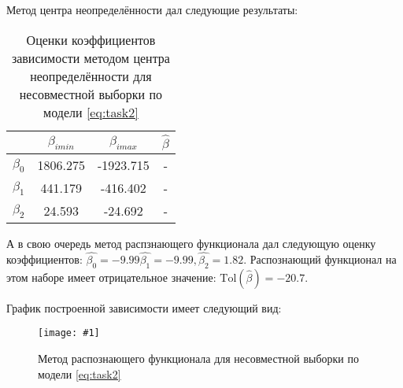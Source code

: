 \documentclass[a4paper,12pt]{article}
\newcommand{\plot}[3]{
    \begin{figure}[H]
        \texttt{[image: \#1]}
        \caption{#2}
        \label{#3}
    \end{figure}
}
\begin{document}
    \noindent Метод центра неопределённости дал следующие результаты:
    \begin{table}[H]
        \begin{center}
            \begin{tabular}{| c | c | c | c |}
                \hline
                & $ \beta_{imin} $ & $ \beta_{imax} $ & $ \hat{\beta} $ \\
                \hline
                $ \beta_{0} $ & 1806.275 & -1923.715 & - \\
                \hline
                $ \beta_{1} $ & 441.179 & -416.402 & - \\
                \hline
                $ \beta_{2} $ & 24.593 & -24.692 & - \\
                \hline
            \end{tabular}
        \end{center}
        \caption{Оценки коэффициентов зависимости методом центра неопределённости для несовместной выборки по модели \ref{eq:task2}}
        \label{t:estimdata50}
    \end{table}

    \noindent А в свою очередь метод распзнающего функционала дал следующую оценку коэффициентов:
    $ \hat{\beta_0} = -9.99 \hat{\beta_{1}} = -9.99, \hat{\beta_{2}} = 1.82 $.
    Распознающий функционал на этом наборе имеет отрицательное значение: $ \text{Tol}(\hat{\beta}) = -20.7 $.

    \noindent График построенной зависимости имеет следующий вид:
    \plot{TolDataWithEstims50}{Метод распознающего функционала для несовместной выборки по модели \ref{eq:task2}}{p:tolestimdata50}
\end{document}
